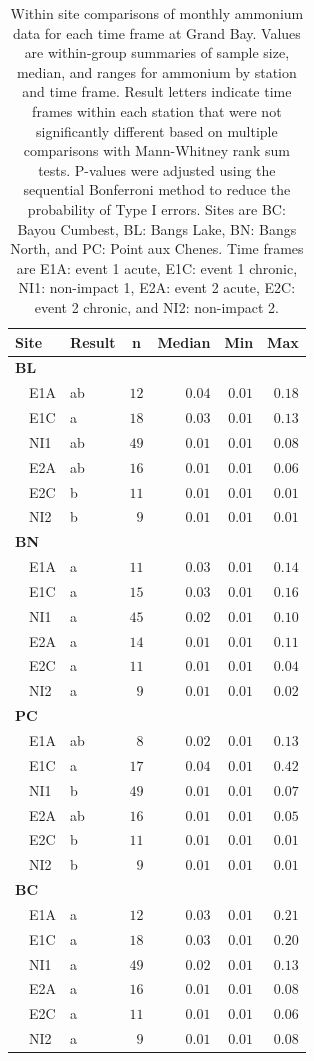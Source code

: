 \documentclass[letterpaper,12pt]{article}\usepackage[]{graphicx}\usepackage[]{color}
\begin{document}
\begin{table}[!tbp]
\caption{Within site comparisons  of monthly ammonium data for each time frame at Grand Bay.  Values are within-group summaries of sample size, median, and ranges for ammonium by station and time frame.  Result letters indicate time frames within each station that were not significantly different based on multiple comparisons with Mann-Whitney rank sum tests.  P-values were adjusted using the sequential Bonferroni method to reduce the probability of Type I errors. Sites are BC: Bayou Cumbest, BL: Bangs Lake, BN: Bangs North, and PC: Point aux Chenes.  Time frames are E1A: event 1 acute, E1C: event 1 chronic, NI1: non-impact 1, E2A: event 2 acute, E2C: event 2 chronic, and NI2: non-impact 2.\label{tab:ammontab}} 
\begin{center}
\begin{tabular}{llrrrr}
\hline\hline
\multicolumn{1}{l}{Site}&\multicolumn{1}{c}{Result}&\multicolumn{1}{c}{n}&\multicolumn{1}{c}{Median}&\multicolumn{1}{c}{Min}&\multicolumn{1}{c}{Max}\tabularnewline
\hline
{\bfseries BL}&&&&&\tabularnewline
~~E1A&ab&$12$&$0.04$&$0.01$&$0.18$\tabularnewline
~~E1C&a&$18$&$0.03$&$0.01$&$0.13$\tabularnewline
~~NI1&ab&$49$&$0.01$&$0.01$&$0.08$\tabularnewline
~~E2A&ab&$16$&$0.01$&$0.01$&$0.06$\tabularnewline
~~E2C&b&$11$&$0.01$&$0.01$&$0.01$\tabularnewline
~~NI2&b&$ 9$&$0.01$&$0.01$&$0.01$\tabularnewline
\hline
{\bfseries BN}&&&&&\tabularnewline
~~E1A&a&$11$&$0.03$&$0.01$&$0.14$\tabularnewline
~~E1C&a&$15$&$0.03$&$0.01$&$0.16$\tabularnewline
~~NI1&a&$45$&$0.02$&$0.01$&$0.10$\tabularnewline
~~E2A&a&$14$&$0.01$&$0.01$&$0.11$\tabularnewline
~~E2C&a&$11$&$0.01$&$0.01$&$0.04$\tabularnewline
~~NI2&a&$ 9$&$0.01$&$0.01$&$0.02$\tabularnewline
\hline
{\bfseries PC}&&&&&\tabularnewline
~~E1A&ab&$ 8$&$0.02$&$0.01$&$0.13$\tabularnewline
~~E1C&a&$17$&$0.04$&$0.01$&$0.42$\tabularnewline
~~NI1&b&$49$&$0.01$&$0.01$&$0.07$\tabularnewline
~~E2A&ab&$16$&$0.01$&$0.01$&$0.05$\tabularnewline
~~E2C&b&$11$&$0.01$&$0.01$&$0.01$\tabularnewline
~~NI2&b&$ 9$&$0.01$&$0.01$&$0.01$\tabularnewline
\hline
{\bfseries BC}&&&&&\tabularnewline
~~E1A&a&$12$&$0.03$&$0.01$&$0.21$\tabularnewline
~~E1C&a&$18$&$0.03$&$0.01$&$0.20$\tabularnewline
~~NI1&a&$49$&$0.02$&$0.01$&$0.13$\tabularnewline
~~E2A&a&$16$&$0.01$&$0.01$&$0.08$\tabularnewline
~~E2C&a&$11$&$0.01$&$0.01$&$0.06$\tabularnewline
~~NI2&a&$ 9$&$0.01$&$0.01$&$0.08$\tabularnewline
\hline
\end{tabular}\end{center}

\end{table}
\end{document}
